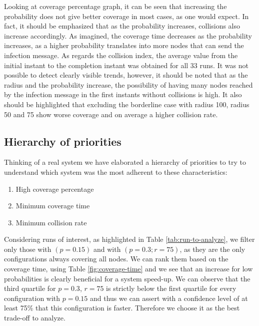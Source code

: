 \noindent Looking at coverage percentage graph, it can be seen that increasing the probability does not give better coverage in most cases, as one would expect. In fact, it should be emphasized that as the probability increases, collisions also increase accordingly. As imagined, the coverage time decreases as the probability increases, as a higher probability translates into more nodes that can send the infection message. As regards the collision index, the average value from the initial instant to the completion instant was obtained for all 33 runs. It was not possible to detect clearly visible trends, however, it should be noted that as the radius and the probability increase, the possibility of having many nodes reached by the infection message in the first instants without collisions is high. It also should be highlighted that excluding the borderline case with radius 100, radius 50 and 75 show worse coverage and on average a higher collision rate. 

\clearpage 

\subsection{Hierarchy of priorities}
Thinking of a real system we have elaborated a hierarchy of priorities to try to understand which system was the most adherent to these characteristics:

\begin{enumerate}
\item High coverage percentage
\item Minimum coverage time
\item Minimum collision rate
\end{enumerate}

Considering runs of interest, as highlighted in Table \ref{tab:run-to-analyze}, we filter only those with $(p=0.15)$ and with $(p=0.3;r=75)$, as they are the only configurations always covering all nodes.
We can rank them based on the coverage time, using Table \ref{fig:coverage-time} and we see that an increase for low probabilities is clearly beneficial for a system speed-up. We can observe that the third quartile for $p=0.3$, $r=75$ is strictly below the first quartile for every configuration with $p=0.15$ and thus we can assert with a confidence level of at least 75\% that this configuration is faster. Therefore we choose it as the best trade-off to analyze.

